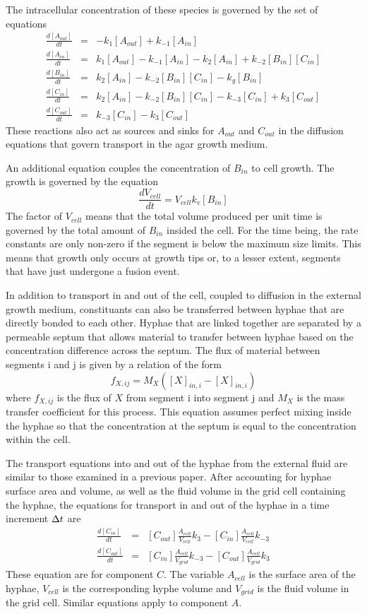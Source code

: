 \documentclass[12pt]{article}
\begin{document}
The intracellular concentration of these species is governed by the set of equations
\begin{eqnarray*}
\frac{d [A_{out}]}{d t} &=&-k_1 [A_{out}]+k_{-1} [A_{in}] \\
\frac{d [A_{in}]}{d t} &=&k_1 [A_{out}]-k_{-1} [A_{in}] - k_2 [A_{in}]
 + k_{-2}[B_{in}][C_{in}]\\
\frac{d [B_{in}]}{d t} &=&k_2 [A_{in}] - k_{-2}[B_{in}][C_{in}] - k_g[B_{in}]\\
\frac{d [C_{in}]}{d t} &=&k_2 [A_{in}] - k_{-2}[B_{in}][C_{in}]-k_{-3} [C_{in}]
+ k_3 [C_{out}] \\
\frac{d [C_{out}]}{d t} &=&k_{-3} [C_{in}]-k_3 [C_{out}]
\end{eqnarray*}
These reactions also act as sources and sinks for $A_{out}$ and $C_{out}$ in the diffusion
equations that govern transport in the agar growth medium.

An additional equation couples the concentration of $B_{in}$ to cell growth.
The growth is governed by the equation
\[
\frac{dV_{cell}}{dt} = V_{cell}k_v[B_{in}]
\]
The factor of $V_{cell}$ means that the total volume produced per unit time is
governed by the total amount of $B_{in}$ insided the cell. For the time being,
the rate constants are only non-zero if the segment is below the maximum size
limits. This means that growth only occurs at growth tips or, to a lesser
extent, segments that have just undergone a fusion event.

In addition to transport in and out of the cell, coupled to diffusion in the external
growth medium, constituants can also be transferred between hyphae that are directly
bonded to each other. Hyphae that are linked together are separated by a permeable septum
that allows material to transfer between hyphae based on the concentration difference
across the septum. The flux of material between segments i and j is given by a relation
of the form
\[
f_{X,ij} = M_X ([X]_{in,i}-[X]_{in,i})
\]
where $f_{X,ij}$ is the flux of $X$ from segment i into segment j and $M_X$ is the mass
transfer coefficient for this process. This equation assumes perfect mixing inside the hyphae
so that the concentration at the septum is equal to the concentration within the cell.

The transport equations into and out of the hyphae from the external fluid are similar to those
examined in a previous paper.
After accounting for hyphae surface area and volume, as well as the fluid volume in the grid cell
containing the hyphae, the equations for transport in and out of the hyphae in a time increment
$\Delta t$ are
\begin{eqnarray*}
\frac{d [C_{in}]}{dt} &=& [C_{out}]\frac{A_{cell}}{V_{cell}}k_3 - [C_{in}]\frac{A_{cell}}{V_{cell}}
k_{-3} \\
\frac{d[C_{out}]}{dt} &=& [C_{in}]\frac{A_{cell}}{V_{grid}}k_{-3} - [C_{out}]\frac{A_{cell}}{V_{grid}}
k_{3}
\end{eqnarray*}
These equation are for component $C$. The variable $A_{cell}$ is the surface area of the hyphae,
$V_{cell}$ is the corresponding hyphe volume and $V_{grid}$ is the fluid volume in the grid cell.
Similar equations apply to component $A$.
\end{document}
